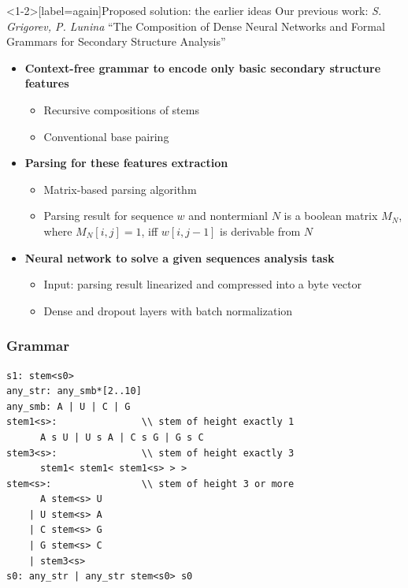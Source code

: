 \documentclass[xcolor=table]{beamer}
\begin{document}
\begin{frame}<1-2>[label=again]{Proposed solution: the earlier ideas}
Our previous work: 
\emph{S. Grigorev, P. Lunina} ``The Composition of Dense Neural Networks and Formal Grammars for Secondary Structure Analysis''
\vspace{0.5cm}
\begin{itemize}
   \item \textbf<2>{Context-free grammar to encode only basic secondary structure features}
    \begin{itemize}
        \item Recursive compositions of stems
        \item Conventional base pairing
    \end{itemize}
    \item \textbf<3>{Parsing for these features extraction}
    \begin{itemize}
        \item Matrix-based parsing algorithm 
        \item Parsing result for sequence $w$ and nontermianl $N$ is a boolean matrix $M_N$, where $M_N [i,j] = 1$, iff $w[i,j-1]$ is derivable from $N$
    \end{itemize}
    \item \textbf<4>{Neural network to solve a given sequences analysis task}
        \begin{itemize}
        \item Input: parsing result linearized and compressed into a byte vector
        \item Dense and dropout layers with batch normalization 
    \end{itemize}
\end{itemize}
\end{frame}

\begin{frame}[fragile] \frametitle{Grammar}
\begin{verbatim}
s1: stem<s0>
any_str: any_smb*[2..10]
any_smb: A | U | C | G
stem1<s>:               \\ stem of height exactly 1
      A s U | U s A | C s G | G s C
stem3<s>:               \\ stem of height exactly 3
      stem1< stem1< stem1<s> > >
stem<s>:                \\ stem of height 3 or more
      A stem<s> U
    | U stem<s> A
    | C stem<s> G
    | G stem<s> C
    | stem3<s>
s0: any_str | any_str stem<s0> s0
\end{verbatim}
\end{frame}
\end{document}

